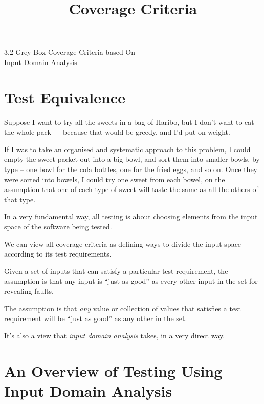 



\title{Coverage Criteria}{3.2 Grey-Box Coverage Criteria based On \\ Input Domain Analysis}

\section{Test Equivalence}
%

Suppose I want to try all the sweets in a bag of Haribo, but I don't want to eat
the whole pack --- because that would be greedy, and I'd put on weight.


If I was to take an organised and systematic approach to this problem, I could
empty the sweet packet out into a big bowl, and sort them into smaller bowls,
by type -- one bowl for the cola bottles, one for the fried eggs, and so on.
Once they were sorted into bowels, I could try one sweet from each bowel, on the
assumption that one of each type of sweet will taste the same as all the others
of that type. 



In a very fundamental way, all testing is about choosing elements from the input
space of the software being tested. 

We can view all coverage criteria as defining ways to divide the input space
according to its test requirements. 

Given a set of inputs that can satisfy a particular test requirement, the
assumption is that any input is ``just as good'' as every other input in the set
for revealing faults. 

The assumption is that {\it any} value or collection of values that satisfies a
test requirement will be ``just as good'' as any other in the set. 

It's also a view that {\it input domain analysis} takes, in a very direct way.


\section{An Overview of Testing Using Input Domain Analysis}

